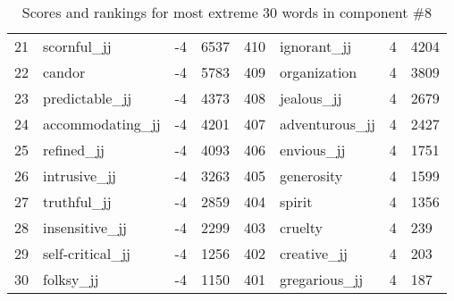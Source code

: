 \begin{table}[tbp]
\begin{tabular}{| rlr@{.}l | rlr@{.}l |}
    21 & scornful\_jj & -4 & 6537    &    410 & ignorant\_jj & 4 & 4204 \\
    22 & candor & -4 & 5783    &    409 & organization & 4 & 3809 \\
    23 & predictable\_jj & -4 & 4373    &    408 & jealous\_jj & 4 & 2679 \\
    24 & accommodating\_jj & -4 & 4201    &    407 & adventurous\_jj & 4 & 2427 \\
    25 & refined\_jj & -4 & 4093    &    406 & envious\_jj & 4 & 1751 \\
    26 & intrusive\_jj & -4 & 3263    &    405 & generosity & 4 & 1599 \\
    27 & truthful\_jj & -4 & 2859    &    404 & spirit & 4 & 1356 \\
    28 & insensitive\_jj & -4 & 2299    &    403 & cruelty & 4 & 239 \\
    29 & self-critical\_jj & -4 & 1256    &    402 & creative\_jj & 4 & 203 \\
    30 & folksy\_jj & -4 & 1150    &    401 & gregarious\_jj & 4 & 187 \\
    \hline
    \end{tabular}
    \caption{Scores and rankings for most extreme 30 words in component \#8} 
\end{table}
\clearpage
